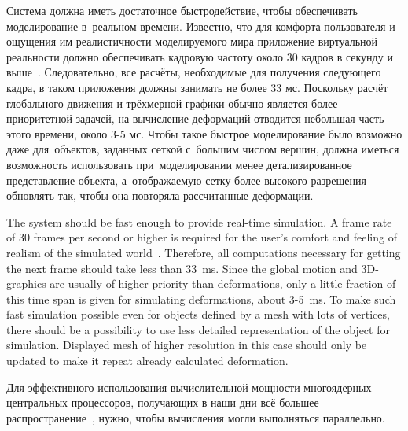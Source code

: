 \documentclass[a4paper, 12pt, titlepage]{extarticle}
\begin{document}
\begin{original}
    Система должна иметь достаточное быстродействие, чтобы обеспечивать моделирование в~реальном
    времени. Известно, что для комфорта пользователя и ощущения им реалистичности моделируемого мира
    приложение виртуальной реальности должно обеспечивать кадровую частоту около 30 кадров в секунду %
    и выше~\cite{claypool-framerate}. Следовательно, все расчёты, необходимые для получения
    следующего кадра, в таком приложения должны занимать не более 33 мс. Поскольку расчёт глобального
    движения и трёхмерной графики обычно является более приоритетной задачей, на вычисление
    деформаций отводится небольшая часть этого времени, около 3-5 мс. Чтобы такое быстрое
    моделирование было возможно даже для~объектов, заданных сеткой с~большим числом вершин,
    должна иметься возможность использовать при~моделировании менее детализированное представление
    объекта, а~отображаемую сетку более высокого разрешения обновлять так, чтобы она повторяла
    рассчитанные деформации. %
\end{original}

    The system should be fast enough to provide real-time simulation. A frame rate of 30 frames per
    second or higher is required for the user's comfort and feeling of realism of the simulated
    world~\cite{claypool-framerate}. Therefore, all computations necessary for getting the next
    frame should take less than 33~ms. Since the global motion and 3D-graphics are usually of
    higher priority than deformations, only a little fraction of this time span is given for
    simulating deformations, about 3-5~ms. To make such fast simulation possible even for objects
    defined by a mesh with lots of vertices, there should be a possibility to use less detailed
    representation of the object for simulation. Displayed mesh of higher resolution in this case
    should only be updated to make it repeat already calculated deformation.

\begin{original}
    Для эффективного использования вычислительной мощности многоядерных центральных процессоров,
    получающих в наши дни всё большее распространение~\cite{steam-hardware}, нужно, чтобы вычисления могли
    выполняться параллельно.
\end{original}
\end{document}
